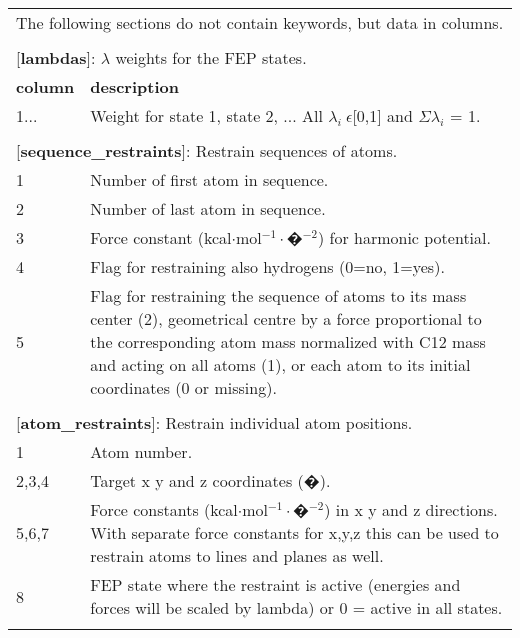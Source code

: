 \documentclass[a4paper,10pt]{article}
\begin{document}
\begin{longtable}{|p{78pt}|p{158pt}|p{158pt}|}
\multicolumn{3}{p{394pt}}{The following sections do not contain keywords, but data in columns.}\\
\multicolumn{3}{p{394pt}}{}\\

\multicolumn{3}{p{394pt}}{[\textbf{lambdas}]: $\lambda$ weights for the FEP states.}\\
\hline \textbf{column} & \multicolumn{2}{p{320pt}|}{\textbf{description}}\\
\hline1... & \multicolumn{2}{p{320pt}|}{Weight for state 1, state 2, ... All $\lambda_i ~ \epsilon$[0,1] and $\Sigma\lambda_i$ = 1.}\\
\hline
\multicolumn{3}{p{394pt}}{}\\

\multicolumn{3}{p{394pt}}{[\textbf{sequence\_restraints}]: Restrain sequences of atoms.}\\
\hline 1 & \multicolumn{2}{p{320pt}|}{Number of first atom in sequence.}\\
\hline 2 & \multicolumn{2}{p{320pt}|}{Number of last atom in sequence.}\\
\hline 3 & \multicolumn{2}{p{320pt}|}{Force constant (kcal$\cdot$mol$^{-1}\cdot$�$^{-2}$) for harmonic potential.}\\
\hline 4 & \multicolumn{2}{p{320pt}|}{Flag for restraining also hydrogens (0=no, 1=yes).}\\
\hline 5 & \multicolumn{2}{p{320pt}|}{Flag for restraining the sequence of atoms to its mass center (2), geometrical centre by a force proportional to the corresponding atom mass normalized with C12 mass and acting on all atoms (1), or each atom to its initial coordinates (0 or missing).}\\
\hline
\multicolumn{3}{p{394pt}}{}\\

\multicolumn{3}{p{394pt}}{[\textbf{atom\_restraints}]: Restrain individual atom positions.}\\
\hline 1 & \multicolumn{2}{p{320pt}|}{Atom number.}\\
\hline 2,3,4 & \multicolumn{2}{p{320pt}|}{Target x y and z coordinates (�).}\\
\hline 5,6,7 & \multicolumn{2}{p{320pt}|}{Force constants (kcal$\cdot$mol$^{-1}\cdot$�$^{-2}$) in x y and z directions. With separate force constants for x,y,z this can be used to restrain atoms to lines and planes as well.}\\
\hline 8 & \multicolumn{2}{p{320pt}|}{FEP state where the restraint is active (energies and forces will be scaled by lambda) or 0 = active in all states.}\\
\hline
\multicolumn{3}{p{394pt}}{}\\


\end{longtable}
\end{document}
